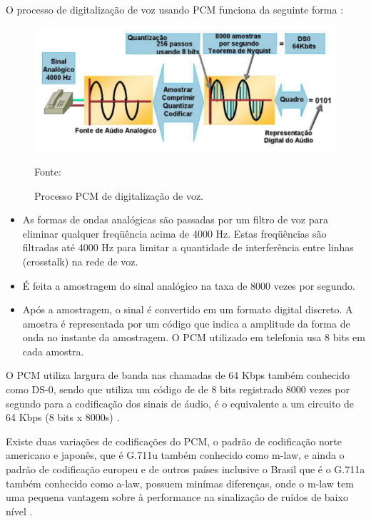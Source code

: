 O processo de digitalização de voz usando PCM funciona da seguinte forma \cite{eduardomaronasmonks2006}:

\begin{figure}[h]
	\centering
	\includegraphics[width=16.0cm]{imagens/processoPCMdigital.jpg}
	\caption{Processo PCM de digitalização de voz.}
    \label{Figura4}
    Fonte: \cite{eduardomaronasmonks2006}
\end{figure}

\begin{itemize}
  \item As formas de ondas analógicas são passadas por um filtro de voz para eliminar qualquer freqüência acima de 4000 Hz. Estas freqüências são filtradas até 4000 Hz para limitar a quantidade de interferência entre linhas (crosstalk) na rede de voz.
  \item É feita a amostragem do sinal analógico na taxa de 8000 vezes por segundo.
  \item Após a amostragem, o sinal é convertido em um formato digital discreto. A amostra é representada por um código que indica a amplitude da forma de onda no instante da amostragem. O PCM utilizado em telefonia usa 8 bits em cada amostra.
\end{itemize}
	
O PCM utiliza largura de banda nas chamadas de 64 Kbps também conhecido como DS-0, sendo que utiliza um código de de 8 bits registrado 8000 vezes por segundo para a codificação dos sinais de áudio, é o equivalente a um circuito de 64 Kbps (8 bits x 8000s) \cite{alexandrekeller2014}.

Existe duas variações de codificações do PCM, o padrão de codificação norte americano e japonês, que é G.711u também conhecido como m-law, e ainda o padrão de codificação europeu e de outros países inclusive o Brasil que é o G.711a também conhecido como a-law, possuem minímas diferenças, onde o m-law tem uma pequena vantagem sobre à performance na sinalização de ruídos de baixo nível \cite{gomeslemoscolcher1995}.

